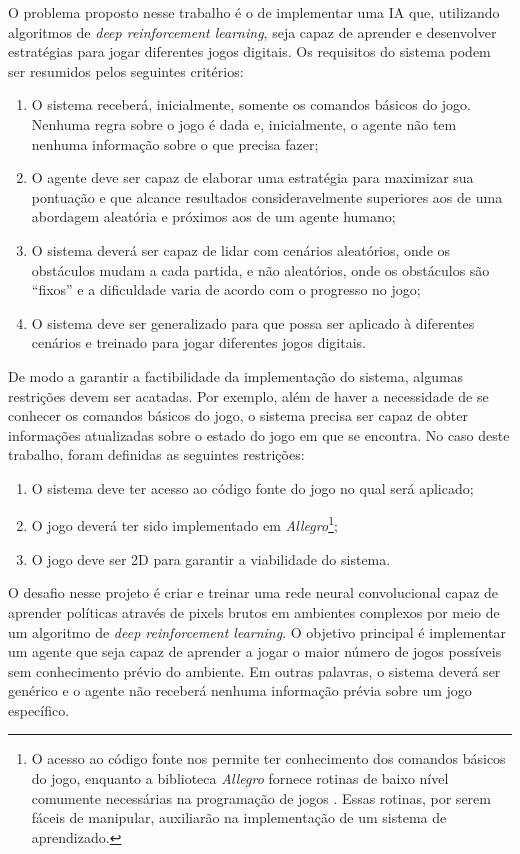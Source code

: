  O problema proposto nesse trabalho é o de implementar uma IA que, utilizando algoritmos de \textit{deep reinforcement learning}, seja capaz de aprender e desenvolver estratégias para jogar diferentes jogos digitais. Os requisitos do sistema podem ser resumidos pelos seguintes critérios:
\begin{enumerate}
	\item O sistema receberá, inicialmente, somente os comandos básicos do jogo. Nenhuma regra sobre o jogo é dada e, inicialmente, o agente não tem nenhuma informação sobre o que precisa fazer;
	\item O agente deve ser capaz de elaborar uma estratégia para maximizar sua pontuação e que alcance resultados consideravelmente superiores aos de uma abordagem aleatória e próximos aos de um agente humano;
	\item O sistema deverá ser capaz de lidar com cenários aleatórios, onde os obstáculos mudam a cada partida, e não aleatórios, onde os obstáculos são ``fixos'' e a dificuldade varia de acordo com o progresso no jogo;
	\item O sistema deve ser generalizado para que possa ser aplicado à diferentes cenários e treinado para jogar diferentes jogos digitais.
\end{enumerate}

De modo a garantir a factibilidade da implementação do sistema, algumas restrições devem ser acatadas. Por exemplo, além de haver a necessidade de se conhecer os comandos básicos do jogo, o sistema precisa ser capaz de obter informações atualizadas sobre o estado do jogo em que se encontra. No caso deste trabalho, foram definidas as seguintes restrições:

\begin{enumerate}
	\item O sistema deve ter acesso ao código fonte do jogo no qual será aplicado;
	\item O jogo deverá ter sido implementado em \textit{Allegro}\footnote{O acesso ao código fonte nos permite ter conhecimento dos comandos básicos do jogo, enquanto a biblioteca \textit{Allegro} fornece rotinas de baixo nível comumente necessárias na programação de jogos \cite{allegro}. Essas rotinas, por serem fáceis de manipular, auxiliarão na implementação de um sistema de aprendizado.};
	\item O jogo deve ser 2D para garantir a viabilidade do sistema.
\end{enumerate}

O desafio nesse projeto é criar e treinar uma rede neural convolucional capaz de aprender políticas através de pixels brutos em ambientes complexos por meio de um algoritmo de \textit{deep reinforcement learning}. O objetivo principal é implementar um agente que seja capaz de aprender a jogar o maior número de jogos possíveis sem conhecimento prévio do ambiente. Em outras palavras, o sistema deverá ser genérico e o agente não receberá nenhuma informação prévia sobre um jogo específico.

